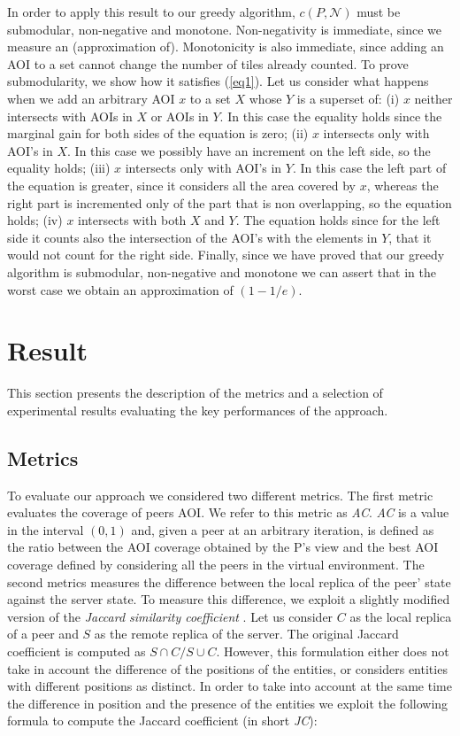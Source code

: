 \documentclass[final,10pt,a5paper]{phdimt}
\theoremstyle{definition}
\begin{document}
In order to apply this result to our greedy algorithm, $c(P, \mathscr{N})$ must be submodular, non-negative and monotone. Non-negativity is immediate, since we measure an (approximation of). Monotonicity is also immediate, since adding an AOI to a set cannot change the number of tiles already counted. 
To prove submodularity, we show how it satisfies (\ref{eq1}). Let us consider what happens when we add an arbitrary AOI $x$ to a set $X$ whose $Y$ is a superset of: (i) $x$ neither intersects with AOIs in $X$ or AOIs in $Y$. In this case the equality holds since the marginal gain for both sides of the equation is zero; (ii) $x$ intersects only with AOI's in $X$. In this case we possibly have an increment on the left side, so the equality holds; (iii) $x$ intersects only with AOI's in $Y$. In this case the left part of the equation is greater, since it considers all the area covered by $x$, whereas the right part is incremented only of the part that is non overlapping, so the equation holds; (iv) $x$ intersects with both $X$ and $Y$. The equation holds since for the left side it counts also the intersection of the AOI's with the elements in $Y$, that it would not count for the right side.
Finally, since we have proved that our greedy algorithm is submodular, non-negative and monotone we can assert that in the worst case we obtain an approximation of $(1-1/e)$.



\section{Result}


This section presents the description of the metrics and a selection of experimental results evaluating the key performances of the approach.



\subsection{Metrics}

To evaluate our approach we considered two different metrics. 
The first metric evaluates the coverage of peers AOI. We refer to this metric as \textit{AC}. \textit{AC} is a value in the interval $(0,1)$ and, given a peer at an arbitrary iteration, is defined as  the ratio between the AOI coverage obtained by the P's view and the best AOI coverage defined by considering all the peers in the virtual environment. 
The second metrics measures the difference between the local replica of the peer' state against the server state.
To measure this difference, we exploit a slightly modified version of the \textit{Jaccard similarity coefficient} \cite{lee1999measures}.
Let us consider $C$ as the local replica of a peer and $S$ as the remote replica of the server.
The original Jaccard coefficient is computed as $S \cap C / S \cup C$.
However, this formulation either does not take in account the difference of the positions of the entities, or considers entities with different positions as distinct.
In order to take into account at the same time the difference in position and the presence of the entities we exploit the following formula to compute the Jaccard coefficient (in short \textit{JC}):
\end{document}
